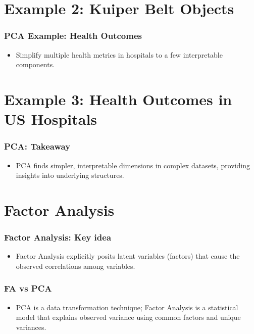 \documentclass{beamer}
\begin{document}
\section{Example 2: Kuiper Belt Objects}

\begin{frame}
    \frametitle{PCA Example: Health Outcomes}
    \begin{itemize}
        \item Simplify multiple health metrics in hospitals to a few interpretable components.
    \end{itemize}
\end{frame}

\section{Example 3: Health Outcomes in US Hospitals}

\begin{frame}
    \frametitle{PCA: Takeaway}
    \begin{itemize}
        \item PCA finds simpler, interpretable dimensions in complex datasets, providing insights into underlying structures.
    \end{itemize}
\end{frame}

\section{Factor Analysis}

\begin{frame}
    \frametitle{Factor Analysis: Key idea}
    \begin{itemize}
        \item Factor Analysis explicitly posits \alert{latent variables} (factors) that cause the observed correlations among variables.
    \end{itemize}
\end{frame}

\begin{frame}
    \frametitle{FA vs PCA}
    \begin{itemize}
        \item PCA is a data transformation technique; Factor Analysis is a statistical model that explains observed variance using common factors and unique variances.
    \end{itemize}
\end{frame}
\end{document}
